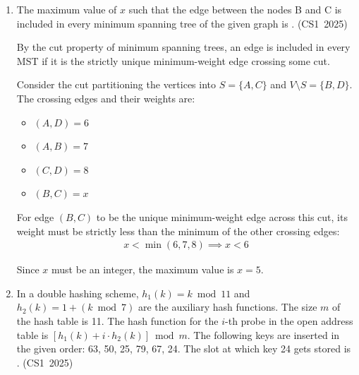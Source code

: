 \begin{enumerate}[label=\thesubsection.\arabic*, ref=\thesubsection.\theenumi]
\begin{center}

\end{center}

After iterating through all digits, the function returns \texttt{newnum} $= 46$.

Therefore, the value printed by the program is $46$.

\vspace{0.5cm}
\item The maximum value of $x$ such that the edge between the nodes B and C is included in every minimum spanning tree of the given graph is \underline{\hspace{1cm}}.
\hfill (CS1~2025)

\begin{figure}[H]
    \centering
    
\end{figure}

\vspace{0.2cm}
\solution
By the cut property of minimum spanning trees, an edge is included in every MST if it is the strictly unique minimum-weight edge crossing some cut. 

Consider the cut partitioning the vertices into $S = \{A, C\}$ and $V \setminus S = \{B, D\}$. The crossing edges and their weights are:
\begin{itemize}
    \item $(A, D) = 6$
    \item $(A, B) = 7$
    \item $(C, D) = 8$
    \item $(B, C) = x$
\end{itemize}

For edge $(B, C)$ to be the unique minimum-weight edge across this cut, its weight must be strictly less than the minimum of the other crossing edges:
\begin{align}
x < \min(6, 7, 8) \implies x < 6
\end{align}

Since $x$ must be an integer, the maximum value is $x = 5$.

\vspace{0.5cm}
\item In a double hashing scheme, $h_1(k) = k \bmod 11$ and $h_2(k) = 1 + (k \bmod 7)$ are the auxiliary hash functions. The size $m$ of the hash table is 11. The hash function for the $i$-th probe in the open address table is $[h_1(k) + i \cdot h_2(k)] \bmod m$. The following keys are inserted in the given order: 63, 50, 25, 79, 67, 24. The slot at which key 24 gets stored is \underline{\hspace{1cm}}.
\hfill (CS1~2025)


\end{enumerate}
